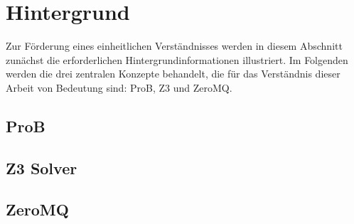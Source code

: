 

\section{Hintergrund}

Zur Förderung eines einheitlichen Verständnisses werden in diesem Abschnitt zunächst die erforderlichen Hintergrundinformationen illustriert.
Im Folgenden werden die drei zentralen Konzepte behandelt, die für das Verständnis dieser Arbeit von Bedeutung sind: ProB, Z3 und ZeroMQ.

\subsection{ProB}
\cite{10.1007/978-3-540-45236-2_46}





\subsection{Z3 Solver}
\cite{10.1007/978-3-031-65627-9_2} \cite{10.1007/978-3-540-78800-3_24}





\subsection{ZeroMQ}
\cite{hintjens2013zeromq} \cite{sustrik2015zeromq}
